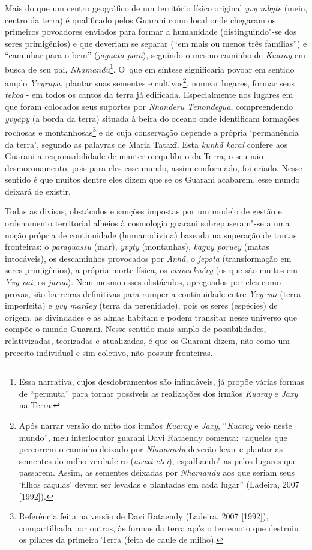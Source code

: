 Mais do que um centro geográfico de um território físico original \emph{yvy
mbyte} (meio, centro da terra) é qualificado pelos Guarani como local
onde chegaram os primeiros povoadores enviados para formar a humanidade
(distinguindo"-se dos seres primigênios) e que deveriam se separar (``em
mais ou menos três famílias'') e ``caminhar para o bem'' (\emph{jaguata porã}),
seguindo o mesmo caminho de \emph{Kuaray} em busca de seu pai,
\emph{Nhamandu}\footnote{Essa narrativa, cujos desdobramentos são infindáveis,
já propõe várias formas de ``permuta'' para tornar possíveis as
realizações dos irmãos \emph{Kuaray} e \emph{Jaxy} na Terra.}. O~que em síntese
significaria povoar em sentido amplo \emph{Yvyrupa}, plantar suas sementes e
cultivos\footnote{Após narrar versão do mito dos irmãos \emph{Kuaray} e \emph{Jaxy},
``\emph{Kuaray} veio neste mundo'', meu interlocutor guarani Davi Rataendy
comenta: ``aqueles que percorrem o caminho deixado por \emph{Nhamandu} deverão
levar e plantar as sementes do milho verdadeiro (\emph{avaxi etei}),
espalhando"-as pelos lugares que passarem. Assim, as sementes deixadas
por \emph{Nhamandu} aos que seriam seus ‘filhos caçulas’ devem ser levadas e
plantadas em cada lugar'' (Ladeira, 2007 [1992]).}, nomear lugares,
formar seus \emph{tekoa} - em todos os cantos da terra já edificada.
Especialmente nos lugares em que foram colocados seus suportes por
\emph{Nhanderu Tenondegua}, compreendendo \emph{yvyapy} (a borda da terra) situada à
beira do oceano onde identificam formações rochosas e
montanhosas\footnote{Referência feita na versão de Davi Rataendy
(Ladeira, 2007 [1992]), compartilhada por outros, às formas da terra
após o terremoto que destruiu os pilares da primeira Terra (feita de
caule de milho). } e de cuja conservação depende a própria ‘permanência
da terra’, segundo as palavras de Maria Tataxĩ.
Esta \emph{kunhã karai} confere aos Guarani a responsabilidade de manter o
equilíbrio da Terra, o seu não desmoronamento, pois para eles esse
mundo, assim conformado, foi criado. Nesse sentido é que muitos dentre
eles dizem que se os Guarani acabarem, esse mundo deixará de existir. 

Todas as divisas, obstáculos e sanções impostas por um modelo de gestão
e ordenamento territorial alheios à cosmologia guarani sobrepuseram"-se
a uma noção própria de continuidade (humanodivina) baseada na superação
de tantas fronteiras: o \emph{paraguassu} (mar), \emph{yvyty} (montanhas), \emph{kaguy
poruey} (matas intocáveis), os descaminhos provocados por \emph{Anhã}, o \emph{jepota}
(transformação em seres primigênios), a própria morte física, os
\emph{etavaekuéry} (os que são muitos em \emph{Yvy vai}, os \emph{jurua}). Nem mesmo esses
obstáculos, apregoados por eles como provas, são barreiras definitivas
para romper a continuidade entre \emph{Yvy vai} (terra imperfeita) e \emph{yvy
marãey} (terra da perenidade), pois os seres (espécies) de origem, as
divindades e as almas habitam e podem transitar nesse universo que
compõe o mundo Guarani. Nesse sentido mais amplo de possibilidades,
relativizadas, teorizadas e atualizadas, é que os Guarani dizem, não
como um preceito individual e sim coletivo, não possuir fronteiras. 

